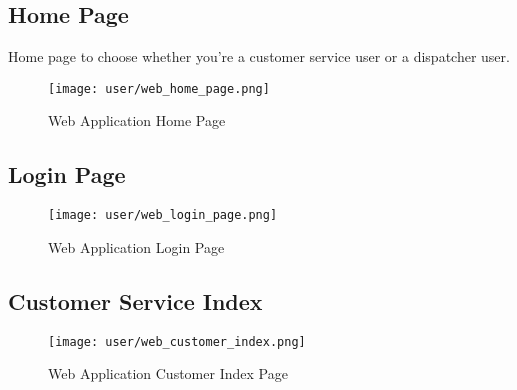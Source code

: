 \subsection{Home Page}
	Home page to choose whether you're a customer service user or a dispatcher user.
	\begin{figure}[ht]
		\centering
		\texttt{[image: user/web\_home\_page.png]}
		\caption{Web Application Home Page}
	\end{figure}
	
\subsection{Login Page}
	\begin{figure}[ht]
		\centering
		\texttt{[image: user/web\_login\_page.png]}
		\caption{Web Application Login Page}
	\end{figure}
	
\subsection{Customer Service Index}
	\begin{figure}[ht]
		\centering
		\texttt{[image: user/web\_customer\_index.png]}
		\caption{Web Application Customer Index Page}
	\end{figure}